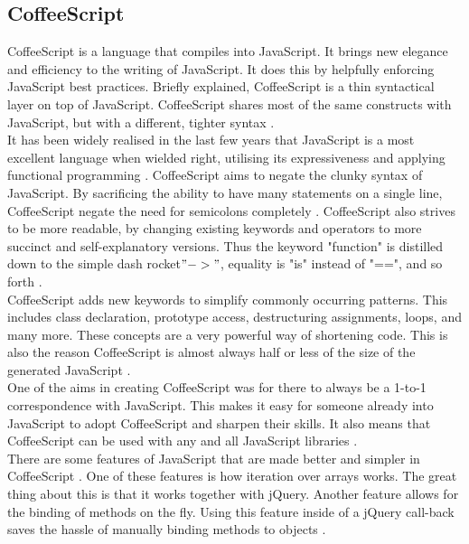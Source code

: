 \documentclass[titlepage,a4paper,11pt]{report}
\begin{document}
\subsection{CoffeeScript}
CoffeeScript is a language that compiles into JavaScript. It brings new elegance and efficiency to the writing of JavaScript. It does this by helpfully enforcing JavaScript best practices. Briefly explained, CoffeeScript is a thin syntactical layer on top of JavaScript. CoffeeScript shares most of the same constructs with JavaScript, but with a different, tighter syntax \citep{jash}.\\

\indent It has been widely realised in the last few years that JavaScript is a most excellent language when wielded right, utilising its expressiveness and applying functional programming \citep{david}.
CoffeeScript aims to negate the clunky syntax of JavaScript. By sacrificing the ability to have many statements on a single line, CoffeeScript negate the need for semicolons completely \citep{waller}. CoffeeScript also strives to be more readable, by changing existing keywords and operators to more succinct and self-explanatory versions. Thus the keyword "function" is distilled down to the simple dash rocket$ "->"$, equality is {"is"} instead of {"=="}, and so forth \citep{jash}.\\

\indent CoffeeScript adds new keywords to simplify commonly occurring patterns. This includes class declaration, prototype access, destructuring assignments, loops, and many more. These concepts are a very powerful way of shortening code. This is also the reason CoffeeScript is almost always half or less of the size of the generated JavaScript \citep{waller}.\\

\indent One of the aims in creating CoffeeScript was for there to always be a 1-to-1 correspondence with JavaScript. This makes it easy for someone already into JavaScript to adopt CoffeeScript and sharpen their skills. It also means that CoffeeScript can be used with any and all JavaScript libraries \citep{jash}.\\

\indent There are some features of JavaScript that are made better and simpler in CoffeeScript \citep{david}. One of these features is how iteration over arrays works. The great thing about this is that it works together with jQuery. Another feature allows for the binding of methods on the fly. Using this feature inside of a jQuery call-back saves the hassle of manually binding methods to objects \citep{jash}. \\
\end{document}
